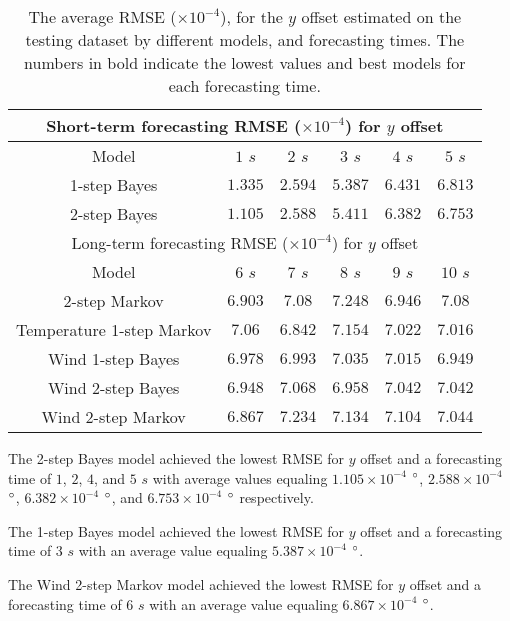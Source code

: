 \documentclass[preprint,12pt]{elsarticle}
\begin{document}
\begin{table}[!ht]
	\centering
	\begin{tabular}{|c|c|c|c|c|c|}
		\hline
		\multicolumn{6}{|c|}{Short-term forecasting RMSE ($\times 10^{-4}$) for $y$ offset} \\ \hline
		Model & $1$ $s$ & $2$ $s$ & $3$ $s$ & $4$ $s$ & $5$ $s$ \\ \hline
		1-step Bayes & $1.335$ & $2.594$ & $\mathbf{5.387}$ & $6.431$ & $6.813$ \\ \hline
		2-step Bayes & $\mathbf{1.105}$ & $\mathbf{2.588}$ & $5.411$ & $\mathbf{6.382}$ & $\mathbf{6.753}$ \\ \hline
		\multicolumn{6}{|c|}{Long-term forecasting RMSE ($\times 10^{-4}$) for $y$ offset} \\ \hline
		Model & $6$ $s$ & $7$ $s$ & $8$ $s$ & $9$ $s$ & $10$ $s$ \\ \hline
		2-step Markov & $6.903$ & $7.08$ & $7.248$ & $\mathbf{6.946}$ & $7.08$ \\ \hline
		Temperature 1-step Markov & $7.06$ & $\mathbf{6.842}$ & $7.154$ & $7.022$ & $7.016$ \\ \hline
		Wind 1-step Bayes & $6.978$ & $6.993$ & $7.035$ & $7.015$ & $\mathbf{6.949}$ \\ \hline
		Wind 2-step Bayes & $6.948$ & $7.068$ & $\mathbf{6.958}$ & $7.042$ & $7.042$ \\ \hline
		Wind 2-step Markov & $\mathbf{6.867}$ & $7.234$ & $7.134$ & $7.104$ & $7.044$ \\ \hline
	\end{tabular}
	\caption{The average RMSE ($\times 10^{-4}$), for the $y$ offset estimated on the testing dataset by different models, and forecasting times. The numbers in bold indicate the lowest values and best models for each forecasting time.}
	\label{tab:best_latitude_RMSE}
\end{table}

The 2-step Bayes model achieved the lowest RMSE for $y$ offset and a forecasting time of $1$, $2$, $4$, and $5$ $s$ with average values equaling $1.105 \times 10^{-4}$ $\degree$, $2.588 \times 10^{-4}$ $\degree$, $6.382 \times 10^{-4}$ $\degree$, and $6.753 \times 10^{-4}$ $\degree$ respectively.

The 1-step Bayes model achieved the lowest RMSE for $y$ offset and a forecasting time of $3$ $s$ with an average value equaling $5.387 \times 10^{-4}$ $\degree$.

The Wind 2-step Markov model achieved the lowest RMSE for $y$ offset and a forecasting time of $6$ $s$ with an average value equaling $6.867 \times 10^{-4}$ $\degree$.
\end{document}
